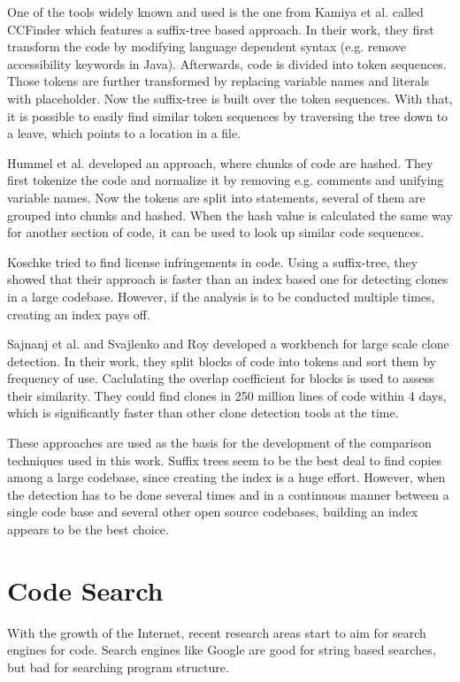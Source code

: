One of the tools widely known and used is the one from Kamiya et al. called CCFinder\cite{kamiya2002ccfinder} which features a suffix-tree based approach.
In their work, they first transform the code by modifying language dependent syntax (e.g. remove accessibility keywords in Java).
Afterwards, code is divided into token sequences.
Those tokens are further transformed by replacing variable names and literals with placeholder.
Now the suffix-tree is built over the token sequences. 
With that, it is possible to easily find similar token sequences by traversing the tree down to a leave, which points to a location in a file.

Hummel et al.\cite{hummel2010index} developed an approach, where chunks of code are hashed.
They first tokenize the code and normalize it by removing e.g. comments and unifying variable names.
Now the tokens are split into statements, several of them are grouped into chunks and hashed.
When the hash value is calculated the same way for another section of code, it can be used to look up similar code sequences.

Koschke \cite{koschke2014large,koschke2012large} tried to find license infringements in code.
Using a suffix-tree, they showed that their approach is faster than an index based one for detecting clones in a large codebase.
However, \glqq if the analysis is to be conducted multiple times, creating an index pays off\grqq \cite{koschke2014large}.

Sajnanj et al. \cite{sajnani2016sourcerercc} and Svajlenko and Roy \cite{svajlenko2017fast} developed a workbench for large scale clone detection.
In their work, they split blocks of code into tokens and sort them by frequency of use.
Caclulating the overlap coefficient for blocks is used to assess their similarity.
They could find clones in 250 million lines of code within 4 days, which is significantly faster than other clone detection tools at the time.

These approaches are used as the basis for the development of the comparison techniques used in this work.
Suffix trees seem to be the best deal to find copies among a large codebase, since creating the index is a huge effort.
However, when the detection has to be done several times and in a continuous manner between a single code base and several other open source codebases, building an index appears to be the best choice.

\section{Code Search}\label{section:related_work/code_search}
With the growth of the Internet, recent research areas start to aim for search engines for code.
Search engines like Google are good for string based searches, but bad for searching program structure.

